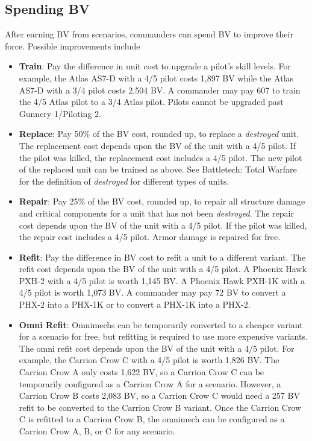 \documentclass[UTF8]{article}
\begin{document}
\newpage

\subsection{Spending BV}

After earning BV from scenarios, commanders can spend BV to improve their force.
Possible improvements include

\begin{itemize}

\item {\bf Train}: Pay the difference in unit cost to upgrade a pilot's skill levels.
For example, the Atlas AS7-D with a 4/5 pilot costs 1,897 BV while the Atlas AS7-D with a 3/4 pilot costs 2,504 BV.
A commander may pay 607 to train the 4/5 Atlas pilot to a 3/4 Atlas pilot.
Pilots cannot be upgraded past Gunnery 1/Piloting 2.

\item {\bf Replace}: Pay 50\% of the BV cost, rounded up, to replace a \emph{destroyed} unit.
The replacement cost depends upon the BV of the unit with a 4/5 pilot.
If the pilot was killed, the replacement cost includes a 4/5 pilot.
The new pilot of the replaced unit can be trained as above.
See Battletech: Total Warfare for the definition of \emph{destroyed} for different types of units.

\item {\bf Repair}: Pay 25\% of the BV cost, rounded up, to repair all structure damage and critical components for a unit that has not been \emph{destroyed}.
The repair cost depends upon the BV of the unit with a 4/5 pilot.
If the pilot was killed, the repair cost includes a 4/5 pilot.
Armor damage is repaired for free.

\item {\bf Refit}: Pay the difference in BV cost to refit a unit to a different variant.
The refit cost depends upon the BV of the unit with a 4/5 pilot.
A Phoenix Hawk PXH-2 with a 4/5 pilot is worth 1,145 BV.
A Phoenix Hawk PXH-1K with a 4/5 pilot is worth 1,073 BV.
A commander may pay 72 BV to convert a PHX-2 into a PHX-1K or to convert a PHX-1K into a PHX-2.

\item {\bf Omni Refit}: Omnimechs can be temporarily converted to a cheaper variant for a scenario for free, but refitting is required to use more expensive variants.
The omni refit cost depends upon the BV of the unit with a 4/5 pilot.
For example, the Carrion Crow C with a 4/5 pilot is worth 1,826 BV.
The Carrion Crow A only costs 1,622 BV, so a Carrion Crow C can be temporarily configured as a Carrion Crow A for a scenario.
However, a Carrion Crow B costs 2,083 BV, so a Carrion Crow C would need a 257 BV refit to be converted to the Carrion Crow B variant.
Once the Carrion Crow C is refitted to a Carrion Crow B, the omnimech can be configured as a Carrion Crow A, B, or C for any scenario.


\end{itemize}
\end{document}
